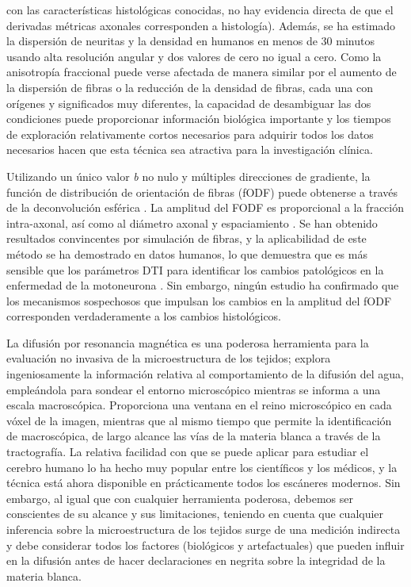 \documentclass[12pt,a5,twoside]{book}
\begin{document}
con las características histológicas conocidas, no hay evidencia directa de que el derivadas métricas axonales corresponden a histología). Además, se ha estimado la dispersión de neuritas y la densidad \citep{127} en humanos en menos de 30 minutos usando alta resolución angular y dos valores de cero no igual a cero. Como la anisotropía fraccional puede verse afectada de manera similar por el aumento de la dispersión de fibras o la reducción de la densidad de fibras, cada una con orígenes y significados muy diferentes, la capacidad de desambiguar las dos condiciones puede proporcionar información biológica importante y los tiempos de exploración relativamente cortos necesarios para adquirir todos los datos necesarios hacen que esta técnica sea atractiva para la investigación clínica.

Utilizando un único valor {\it b} no nulo y múltiples direcciones de gradiente, la función de distribución de orientación de fibras (fODF) puede obtenerse a través de la deconvolución esférica \citep{128}. La amplitud del FODF es proporcional a la fracción intra-axonal, así como al diámetro axonal y espaciamiento \citep{129,130}. Se han obtenido resultados convincentes por simulación de fibras, y la aplicabilidad de este método se ha demostrado en datos humanos, lo que demuestra que es más sensible que los parámetros DTI para identificar los cambios patológicos en la enfermedad de la motoneurona \citep{129}. Sin embargo, ningún estudio ha confirmado que los mecanismos sospechosos que impulsan los cambios en la amplitud del fODF corresponden verdaderamente a los cambios histológicos.

La difusión por resonancia magnética es una poderosa herramienta para la evaluación no invasiva de la microestructura de los tejidos; explora ingeniosamente la información relativa al comportamiento de la difusión del agua, empleándola para sondear el entorno microscópico mientras se informa a una escala macroscópica. Proporciona una ventana en el reino microscópico en cada vóxel de la imagen, mientras que al mismo tiempo que permite la identificación de macroscópica, de largo alcance las vías de la materia blanca a través de la tractografía. La relativa facilidad con que se puede aplicar para estudiar el cerebro humano lo ha hecho muy popular entre los científicos y los médicos, y la técnica está ahora disponible en prácticamente todos los escáneres modernos. Sin embargo, al igual que con cualquier herramienta poderosa, debemos ser conscientes de su alcance y sus limitaciones, teniendo en cuenta que cualquier inferencia sobre la microestructura de los tejidos surge de una medición indirecta y debe considerar todos los factores (biológicos y artefactuales) que pueden influir en la difusión antes de hacer declaraciones en negrita sobre la integridad de la materia blanca.
\clearpage
 

    
\end{document}
